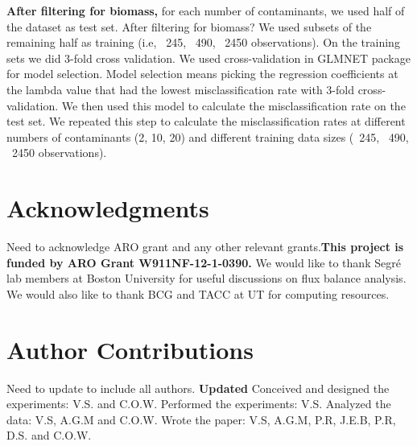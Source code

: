 \documentclass[12pt]{article}
\begin{document}
\textbf{After filtering for biomass, }for each number of contaminants, we used half of the dataset as test set. {\color{red}After filtering for biomass?} We used subsets of the remaining half as training (i.e, ~245, ~490, ~2450 observations). On the training sets we did 3-fold cross validation. We used cross-validation in GLMNET package for model selection. Model selection means picking the regression coefficients at the lambda value that had the lowest misclassification rate with 3-fold cross-validation. We then used this model to calculate the misclassification rate on the test set. We repeated this step to calculate the misclassification rates at different numbers of contaminants (2, 10, 20) and different training data sizes (~245, ~490, ~2450 observations).


\section*{Acknowledgments}
{\color{red}Need to acknowledge ARO grant and any other relevant grants.}\textbf{This project is funded by ARO Grant W911NF-12-1-0390.}
We would like to thank Segr\'e lab members at Boston University for useful discussions on flux balance analysis. We would also like to thank BCG and TACC at UT for computing resources. 

\section*{Author Contributions}
{\color{red}Need to update to include all authors.} \textbf{Updated}
Conceived and designed the experiments: V.S. and C.O.W. Performed the experiments: V.S. Analyzed the data: V.S, A.G.M and C.O.W. Wrote the paper: V.S, A.G.M, P.R, J.E.B, P.R, D.S. and C.O.W.



\newpage
\end{document}

